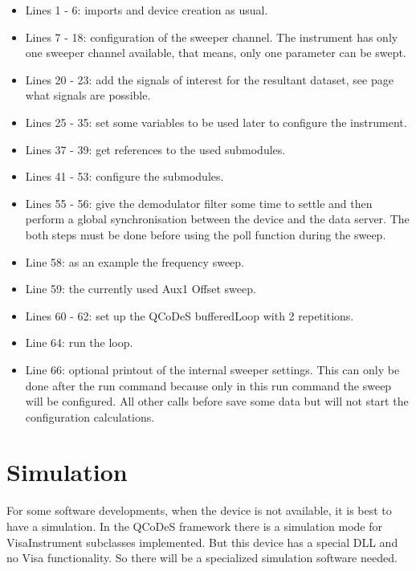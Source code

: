 \documentclass[11pt]{article} %
\begin{document}
\begin{itemize}
\itemsep0pt
\item Lines 1 - 6: imports and device creation as usual.
\item Lines 7 - 18: configuration of the sweeper channel. The instrument has only one sweeper channel available, that means, only one parameter can be swept.
\item Lines 20 - 23: add the signals of interest for the resultant dataset, see page \pageref{sweepresult} what signals are possible.
\item Lines 25 - 35: set some variables to be used later to configure the instrument.
\item Lines 37 - 39: get references to the used submodules.
\item Lines 41 - 53: configure the submodules.
\item Lines 55 - 56: give the demodulator filter some time to settle and then perform a global synchronisation between the device and the data server. The both steps must be done before using the poll function during the sweep.
\item Line 58: as an example the frequency sweep.
\item Line 59: the currently used Aux1 Offset sweep.
\item Lines 60 - 62: set up the QCoDeS bufferedLoop with 2 repetitions.
\item Line 64: run the loop.
\item Line 66: optional printout of the internal sweeper settings. This can only be done after the run command because only in this run command the sweep will be configured. All other calls before save some data but will not start the configuration calculations.
\end{itemize}




\clearpage

\section{Simulation}
For some software developments, when the device is not available, it is best to have a simulation. In the QCoDeS framework there is a simulation mode for VisaInstrument subclasses implemented. But this device has a special DLL and no Visa functionality. So there will be a specialized simulation software needed.
\end{document}
